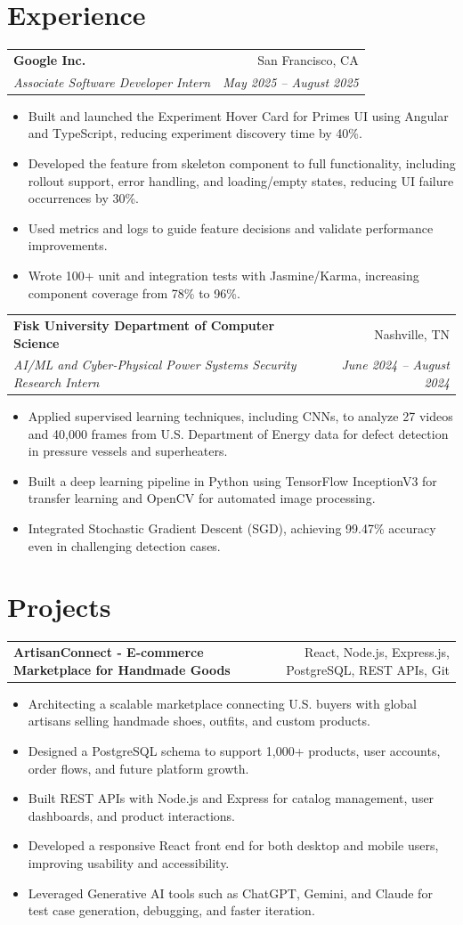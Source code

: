 \documentclass[10pt,letterpaper]{article}
\newcommand{\resumeItemListStart}{\begin{itemize}}
\newcommand{\resumeItemListEnd}{\end{itemize}}
\newcommand{\resumeSubheading}[4]{
  \vspace{1pt}
  \begin{tabularx}{\textwidth}{Xr}
    \textbf{#1} & #2 \\
    \textit{#3} & \textit{#4} \\
  \end{tabularx}\vspace{-3pt}
}
\newcommand{\resumeProjectHeading}[2]{
  \vspace{1pt}
  \begin{tabularx}{\textwidth}{Xr}
    \textbf{#1} & #2 \\
  \end{tabularx}\vspace{-3pt}
}
\begin{document}
\section*{Experience}
\resumeSubheading
{Google Inc.} {San Francisco, CA}
{Associate Software Developer Intern} {May 2025 -- August 2025}
\resumeItemListStart
    \item Built and launched the Experiment Hover Card for Primes UI using Angular and TypeScript, reducing experiment discovery time by 40\%.
    \item Developed the feature from skeleton component to full functionality, including rollout support, error handling, and loading/empty states, reducing UI failure occurrences by 30\%.
    \item Used metrics and logs to guide feature decisions and validate performance improvements.
    \item Wrote 100+ unit and integration tests with Jasmine/Karma, increasing component coverage from 78\% to 96\%.
\resumeItemListEnd

\resumeSubheading
{Fisk University Department of Computer Science} {Nashville, TN}
{AI/ML and Cyber-Physical Power Systems Security Research Intern} {June 2024 -- August 2024}
\resumeItemListStart
    \item Applied supervised learning techniques, including CNNs, to analyze 27 videos and 40,000 frames from U.S. Department of Energy data for defect detection in pressure vessels and superheaters.
    \item Built a deep learning pipeline in Python using TensorFlow InceptionV3 for transfer learning and OpenCV for automated image processing.
    \item Integrated Stochastic Gradient Descent (SGD), achieving 99.47\% accuracy even in challenging detection cases.
\resumeItemListEnd

\section*{Projects}
\resumeProjectHeading
{ArtisanConnect - E-commerce Marketplace for Handmade Goods} {React, Node.js, Express.js, PostgreSQL, REST APIs, Git}
\resumeItemListStart
    \item Architecting a scalable marketplace connecting U.S. buyers with global artisans selling handmade shoes, outfits, and custom products.
    \item Designed a PostgreSQL schema to support 1,000+ products, user accounts, order flows, and future platform growth.
    \item Built REST APIs with Node.js and Express for catalog management, user dashboards, and product interactions.
    \item Developed a responsive React front end for both desktop and mobile users, improving usability and accessibility.
    \item Leveraged Generative AI tools such as ChatGPT, Gemini, and Claude for test case generation, debugging, and faster iteration.
\resumeItemListEnd
\end{document}
